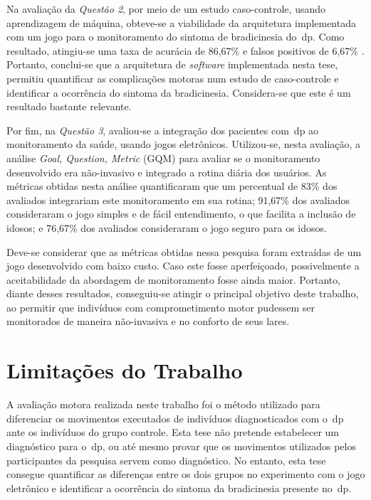 Na avaliação da \textit{Questão 2}, por meio de um estudo caso-controle, usando aprendizagem de máquina, obteve-se a viabilidade da arquitetura implementada com um jogo para o monitoramento do sintoma de bradicinesia do~\ac{dp}. Como resultado, atingiu-se uma taxa de acurácia de 86,67\% e falsos positivos de 6,67\% . Portanto, conclui-se que a arquitetura de \textit{software} implementada nesta tese, permitiu quantificar as complicações motoras num estudo de caso-controle e identificar a ocorrência do sintoma da bradicinesia. Considera-se que este é um resultado bastante relevante.

Por fim, na \textit{Questão 3}, avaliou-se a integração dos pacientes com~\ac{dp} ao monitoramento da saúde, usando jogos eletrônicos. Utilizou-se, nesta avaliação, a análise \textit{Goal, Question, Metric} (GQM) para avaliar se o monitoramento desenvolvido era não-invasivo e integrado a rotina diária dos usuários. As métricas obtidas nesta análise quantificaram que um percentual de 83\% dos avaliados integrariam este monitoramento em sua rotina; 91,67\% dos avaliados consideraram o jogo simples e de fácil entendimento, o que facilita a inclusão de idosos; e 76,67\% dos avaliados consideraram o jogo seguro para os idosos. 

Deve-se considerar que as métricas obtidas nessa pesquisa foram extraídas de um jogo desenvolvido com baixo custo. Caso este fosse aperfeiçoado, possivelmente a aceitabilidade da abordagem de monitoramento fosse ainda maior. Portanto, diante desses resultados, conseguiu-se atingir o principal objetivo deste trabalho, ao permitir que indivíduos com comprometimento motor pudessem ser monitorados de maneira não-invasiva e no conforto de seus lares.


\section{Limitações do Trabalho}\label{section:limitacoes}
A avaliação motora realizada neste trabalho foi o método utilizado para diferenciar os movimentos executados de indivíduos diagnosticados com o~\ac{dp} ante os indivíduos do grupo controle. Esta tese não pretende estabelecer um diagnóstico para o~\ac{dp}, ou até mesmo provar que os movimentos utilizados pelos participantes da pesquisa servem como diagnóstico. No entanto, esta tese consegue quantificar as diferenças entre os dois grupos no experimento com o jogo eletrônico e identificar a ocorrência do sintoma da bradicinesia presente no~\ac{dp}.

